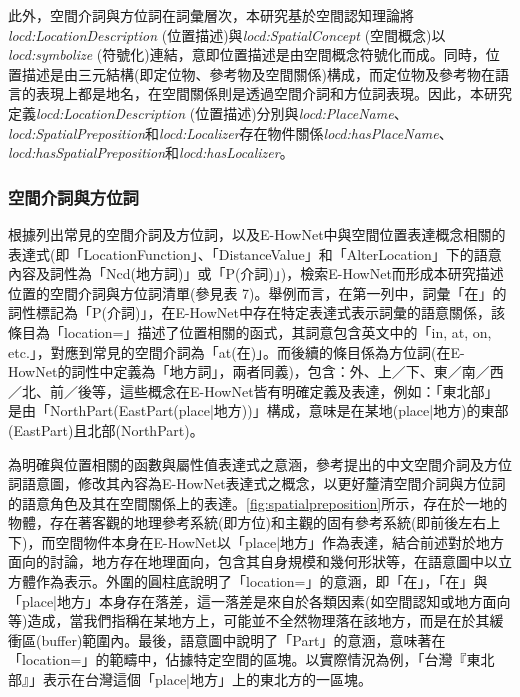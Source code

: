 此外，空間介詞與方位詞在詞彙層次，本研究基於空間認知理論將\textit{locd:LocationDescription} (位置描述)與\textit{locd:SpatialConcept} (空間概念)以\textit{locd:symbolize} (符號化)連結，意即位置描述是由空間概念符號化而成。同時，位置描述是由三元結構(即定位物、參考物及空間關係)構成，而定位物及參考物在語言的表現上都是地名，在空間關係則是透過空間介詞和方位詞表現。因此，本研究定義\textit{locd:LocationDescription} (位置描述)分別與\textit{locd:PlaceName}、\textit{locd:SpatialPreposition}和\textit{locd:Localizer}存在物件關係\textit{locd:hasPlaceName}、\textit{locd:hasSpatialPreposition}和\textit{locd:hasLocalizer}。

\subsubsection{空間介詞與方位詞}

根據\citet{RN45}列出常見的空間介詞及方位詞，以及E-HowNet中與空間位置表達概念相關的表達式(即「LocationFunction」、「DistanceValue」和「AlterLocation」下的語意內容及詞性為「Ncd(地方詞)」或「P(介詞)」)，檢索E-HowNet而形成本研究描述位置的空間介詞與方位詞清單(參見表 7)。舉例而言，在第一列中，詞彙「在」的詞性標記為「P(介詞)」，在E-HowNet中存在特定表達式表示詞彙的語意關係，該條目為「location={}」描述了位置相關的函式，其詞意包含英文中的「in, at, on, etc.」，對應到常見的空間介詞為「at(在)」。而後續的條目係為方位詞(在E-HowNet的詞性中定義為「地方詞」，兩者同義)，包含：外、上／下、東／南／西／北、前／後等，這些概念在E-HowNet皆有明確定義及表達，例如：「東北部」是由「{NorthPart({EastPart({place|地方})})}」構成，意味是在某地(place|地方)的東部(EastPart)且北部(NorthPart)。

為明確與位置相關的函數與屬性值表達式之意涵，參考\citet{RN45}提出的中文空間介詞及方位詞語意圖，修改其內容為E-HowNet表達式之概念，以更好釐清空間介詞與方位詞的語意角色及其在空間關係上的表達。\ref{fig:spatialpreposition}所示，存在於一地的物體，存在著客觀的地理參考系統(即方位)和主觀的固有參考系統(即前後左右上下)，而空間物件本身在E-HowNet以「place|地方」作為表達，結合前述對於地方面向的討論，地方存在地理面向，包含其自身規模和幾何形狀等，在語意圖中以立方體作為表示。外圍的圓柱底說明了「location={}」的意涵，即「在」，「在」與「place|地方」本身存在落差，這一落差是來自於各類因素(如空間認知或地方面向等)造成，當我們指稱在某地方上，可能並不全然物理落在該地方，而是在於其緩衝區(buffer)範圍內。最後，語意圖中說明了「Part」的意涵，意味著在「location={}」的範疇中，佔據特定空間的區塊。以實際情況為例，「台灣『東北部』」表示在台灣這個「place|地方」上的東北方的一區塊。



